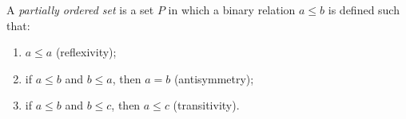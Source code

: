 A \textit{partially ordered set} is a set $P$ in which a binary relation $a \leq b$ is defined such that:
\begin{enumerate}
\item[(i)] $a \leq a$ (reflexivity);
\item[(ii)] if $a \leq b$ and $b \leq a$, then $a = b$ (antisymmetry);
\item[(iii)] if $a \leq b$ and $b \leq c$, then $a \leq c$ (transitivity).
\end{enumerate}
